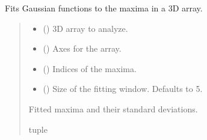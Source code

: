 \documentclass[letterpaper,10pt,english]{sphinxmanual}
\begin{document}

\begin{fulllineitems}
\label{\detokenize{source/stattools:stattools.gaussian_maxima_fitting}}
\pysigstartsignatures
\pysiglinewithargsret
{}
{\sphinxparamcomma {}\sphinxparamcomma {}\sphinxparamcomma {}}
{}
\pysigstopsignatures
\sphinxAtStartPar
Fits Gaussian functions to the maxima in a 3D array.
\begin{quote}\begin{description}
\begin{itemize}
\item {} 
\sphinxAtStartPar
{} () \textendash{} 3D array to analyze.

\item {} 
\sphinxAtStartPar
{} () \textendash{} Axes for the array.

\item {} 
\sphinxAtStartPar
{} () \textendash{} Indices of the maxima.

\item {} 
\sphinxAtStartPar
{} (\sphinxstyleliteralemphasis{\sphinxupquote{, }}) \textendash{} Size of the fitting window. Defaults to 5.

\end{itemize}

\sphinxAtStartPar
Fitted maxima and their standard deviations.

\sphinxAtStartPar
tuple

\end{description}\end{quote}

\end{fulllineitems}
\end{document}
